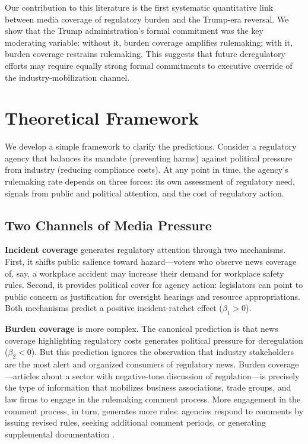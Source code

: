 \documentclass[12pt]{article}
\begin{document}
Our contribution to this literature is the first systematic quantitative link between media coverage of regulatory burden and the Trump-era reversal. We show that the Trump administration's formal commitment was the key moderating variable: without it, burden coverage amplifies rulemaking; with it, burden coverage restrains rulemaking. This suggests that future deregulatory efforts may require equally strong formal commitments to executive override of the industry-mobilization channel.

\section{Theoretical Framework}
\label{sec:theory}

We develop a simple framework to clarify the predictions. Consider a regulatory agency that balances its mandate (preventing harms) against political pressure from industry (reducing compliance costs). At any point in time, the agency's rulemaking rate depends on three forces: its own assessment of regulatory need, signals from public and political attention, and the cost of regulatory action.

\subsection{Two Channels of Media Pressure}

\textbf{Incident coverage} generates regulatory attention through two mechanisms. First, it shifts public salience toward hazard---voters who observe news coverage of, say, a workplace accident may increase their demand for workplace safety rules. Second, it provides political cover for agency action: legislators can point to public concern as justification for oversight hearings and resource appropriations. Both mechanisms predict a positive incident-ratchet effect ($\beta_1 > 0$).

\textbf{Burden coverage} is more complex. The canonical prediction is that news coverage highlighting regulatory costs generates political pressure for deregulation ($\beta_2 < 0$). But this prediction ignores the observation that industry stakeholders are the most alert and organized consumers of regulatory news. Burden coverage---articles about a sector with negative-tone discussion of regulation---is precisely the type of information that mobilizes business associations, trade groups, and law firms to engage in the rulemaking comment process. More engagement in the comment process, in turn, generates more rules: agencies respond to comments by issuing revised rules, seeking additional comment periods, or generating supplemental documentation \citep{mashaw2012greed}.
\end{document}
